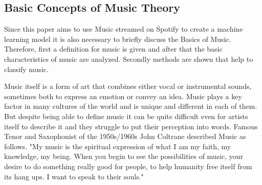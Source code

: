 \subsection{Basic Concepts of Music Theory}

Since this paper aims to use Music streamed on Spotify to create a machine learning model
it is also necessary to briefly discuss the Basics of Music.
Therefore, first a definition for music is given and after that the basic characteristics
of music are analyzed. Secondly methods are shown that help to classify music.

Music itself is a form of art that combines either vocal or instrumental sounds,
sometimes both to express an emotion or convey an idea.\cite{Becker2021WhatIsMusic}
Music plays a key factor in many cultures of the world and is unique and different in each of them.
But despite being able to define music it can be quite difficult even for artists itself to describe
it and they struggle to put their perception into words. Famous Tenor and Saxophonist of
the 1950s/1960s John Coltrane described Music as follows.
"My music is the spiritual expression of what I am my faith, my knowledge, my being.
When you begin to see the possibilities of music, your desire to do something really good for people,
to help humanity free itself from its hang ups. I want to speak to their souls."\cite{Havers2021Sax}


